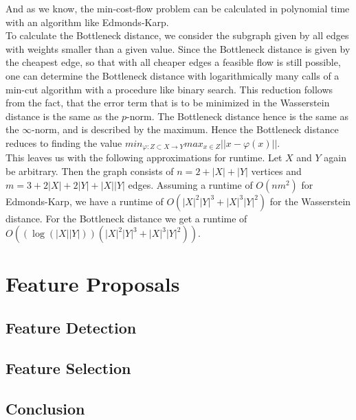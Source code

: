 \documentclass[11pt, a4paper,draft]{report}
\begin{document}
 	And as we know, the min-cost-flow problem can be calculated in polynomial time with an algorithm like Edmonds-Karp.\\
To calculate the Bottleneck distance, we consider the subgraph given by all edges with weights smaller than a given value. Since the Bottleneck distance is given by the cheapest edge, so that with all cheaper edges a feasible flow is still possible, one can determine the Bottleneck distance with logarithmically many calls of a min-cut algorithm with a procedure like binary search. This reduction follows from the fact, that the error term that is to be minimized in the Wasserstein distance is the same as the $p$-norm. The Bottleneck distance hence is the same as the $\infty$-norm, and is described by the maximum. Hence the Bottleneck distance reduces to finding the value $min_{\varphi:Z\subset X \rightarrow Y} max_{x\in Z}||x - \varphi(x)||$.\\
	This leaves us with the following approximations for runtime. Let $X$ and $Y$ again be arbitrary. Then the graph consists of $n=2+|X|+|Y|$ vertices and $m=3+2|X|+2|Y|+|X||Y|$ edges. Assuming a runtime of $O(nm^2)$ for Edmonds-Karp, we have a runtime of $O(|X|^2|Y|^3 + |X|^3|Y|^2)$ for the Wasserstein distance. For the Bottleneck distance we get a runtime of $O((\log(|X||Y|))(|X|^2|Y|^3 + |X|^3|Y|^2))$.
	
\chapter{Feature Proposals}
\section{Feature Detection}
\section{Feature Selection}

\section*{Conclusion}
\end{document}
